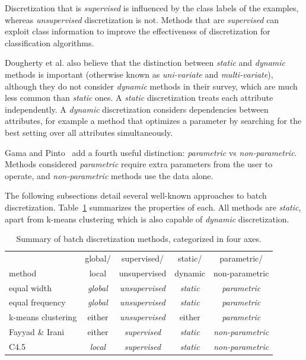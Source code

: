 Discretization that is {\em supervised} is influenced by the class labels of the examples, whereas {\em unsupervised} discretization is not. Methods that are {\em supervised} can exploit class information to improve the effectiveness of discretization for classification algorithms.

Dougherty et al. also believe that the distinction between {\em static} and {\em dynamic} methods is important (otherwise known as {\em uni-variate} and {\em multi-variate}), although they do not consider {\em dynamic} methods in their survey, which are much less common than {\em static} ones. A {\em static} discretization treats each attribute independently. A {\em dynamic} discretization considers dependencies between attributes, for example a method that optimizes a parameter by searching for the best setting over all attributes simultaneously. 

Gama and Pinto~\cite{discretizeds} add a fourth useful distinction: {\em parametric} vs {\em non-parametric}. Methods considered {\em parametric} require extra parameters from the user to operate, and {\em non-parametric} methods use the data alone.

The following subsections detail several well-known approaches to batch discretization. Table~\ref{tab:batchdiscsummary} summarizes the properties of each. All methods are {\em static}, apart from k-means clustering which is also capable of {\em dynamic} discretization.

\begin{table}
\caption{Summary of batch discretization methods, categorized in four axes.}
\label{tab:batchdiscsummary}
\centering
\begin{tabular}{|l|c|c|c|c|}
\hline
 & global/ & supervised/ & static/ & parametric/ \\ 
method & local & unsupervised & dynamic & non-parametric \\ 
\hline
equal width & {\em global} & {\em unsupervised} & {\em static} & {\em parametric} \\
equal frequency & {\em global} & {\em unsupervised} & {\em static} & {\em parametric }\\
k-means clustering & either & {\em unsupervised} & either & {\em parametric} \\
Fayyad \& Irani & either & {\em supervised} & {\em static} & {\em non-parametric} \\
C4.5 & {\em local} & {\em supervised} & {\em static} & {\em non-parametric} \\
\hline
\end{tabular}
\end{table}

